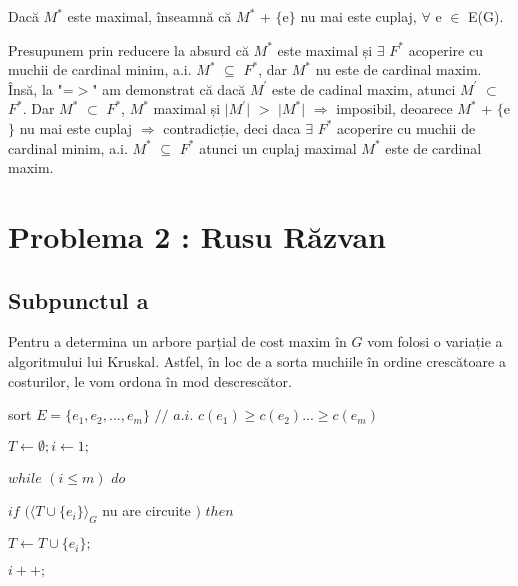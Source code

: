 \documentclass{article}
\begin{document}
{{Dacă $M^*$ este maximal, înseamnă că $M^*$ + $\lbrace$e$\rbrace$ nu mai este cuplaj, $\forall$ e $\in$ E(G). 

Presupunem prin reducere la absurd că $M^*$ este maximal și $\exists$ $F^*$ acoperire cu muchii de cardinal minim, a.i.  $M^*$ $\subseteq$ $F^*$, dar $M^*$ nu este de cardinal maxim. Însă, la "=$>$" am demonstrat că dacă $M^{'}$ este de cadinal maxim, atunci $M^{'}$ $\subset$ $F^*$. Dar $M^*$ $\subset$ $F^*$, $M^*$ maximal și $\vert$$M^{'}$$\vert$ $>$ $\vert$$M^*$$\vert$ $\Rightarrow$ imposibil, deoarece $M^*$ + $\lbrace$e$\rbrace$ nu mai este cuplaj $\Rightarrow$ contradicție, deci daca $\exists$ $F^*$ acoperire cu muchii de cardinal minim, a.i.  $M^*$ $\subseteq$ $F^*$ atunci un cuplaj maximal $M^*$ este de cardinal maxim.

\section*{\fontsize{20}{50}\selectfont Problema 2 : Rusu Răzvan}
\subsection*{\fontsize{16}{30}\selectfont Subpunctul a}
{\fontsize{14}{16}\selectfont 
Pentru a determina un arbore parțial de cost maxim în $G$ vom folosi o variație a algoritmului lui Kruskal. Astfel, în loc de a sorta muchiile în ordine crescătoare a costurilor, le vom ordona în mod descrescător.
    \\ 
    \par sort $E=\lbrace e_1, e_2, ..., e_m \rbrace$ $//$ $a.i.$  $c(e_1)\geq c(e_2)...\geq c(e_m)$

    \par $T \leftarrow \emptyset; i \leftarrow 1;$
    \par $while$  $(i \leq m)$  $do$
    \par \hspace*{1cm} $if$ $(\langle T \cup \lbrace e_i \rbrace \rangle _G$ nu are circuite $)$  $then$
    \par \hspace*{1.5cm} $ T \leftarrow T \cup \lbrace e_i \rbrace ;$
    \par \hspace*{1cm} $i++;$
    }

}}
\end{document}
